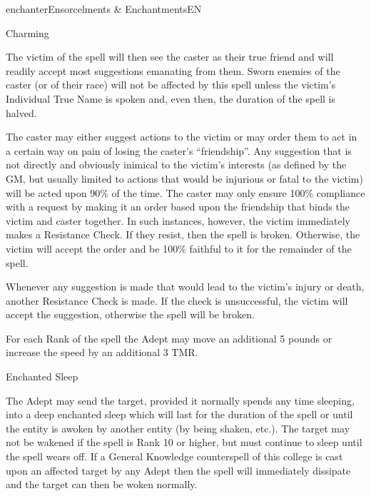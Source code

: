 \begin{College}[1.1]{enchanter}{Ensorcelments \& Enchantments}{EN}
\begin{spell}[G-1]{Charming}
\begin{effects}
The victim of the spell will then see the caster as their true friend
and will readily accept most suggestions emanating from them.  Sworn
enemies of the caster (or of their race) will not be affected by this
spell unless the victim’s Individual True Name is spoken and, even
then, the duration of the spell is halved.

The caster may either suggest actions to the victim or may order them
to act in a certain way on pain of losing the caster’s “friendship”.
Any suggestion that is not directly and obviously inimical to the
victim’s interests (as defined by the GM, but usually limited to
actions that would be injurious or fatal to the victim) will be acted
upon 90\% of the time.  The caster may only ensure 100\% compliance
with a request by making it an order based upon the friendship that
binds the victim and caster together.  In such instances, however, the
victim immediately makes a Resistance Check.  If they resist, then the
spell is broken.  Otherwise, the victim will accept the order and be
100\% faithful to it for the remainder of the spell.

Whenever any suggestion is made that would lead to the victim’s injury
or death, another Resistance Check is made.  If the check is
unsuccessful, the victim will accept the suggestion, otherwise the
spell will be broken.

For each Rank of the spell the Adept may move an additional 5 pounds
or increase the speed by an additional 3 TMR.
\end{effects}
\end{spell}

\begin{spell}[G-3]{Enchanted Sleep}

\begin{effects}
The Adept may send the target, provided it normally spends any time
sleeping, into a deep enchanted sleep which will last for the duration
of the spell or until the entity is awoken by another entity (by being
shaken, etc.).  The target may not be wakened if the spell is Rank 10
or higher, but must continue to sleep until the spell wears off. If a
General Knowledge counterspell of this college is cast upon an
affected target by any Adept then the spell will immediately dissipate
and the target can then be woken normally.
\end{effects}
\end{spell}


\end{College}
